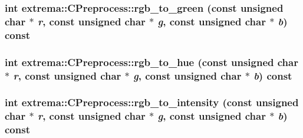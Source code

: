 \hypertarget{classextrema_1_1CPreprocess_2e6c88fd73ae9e2728e153124d6b55f0}{
\subsubsection[rgb\_\-to\_\-green]{\setlength{\rightskip}{0pt plus 5cm}int extrema::CPreprocess::rgb\_\-to\_\-green (const unsigned char $\ast$ {\em r}, const unsigned char $\ast$ {\em g}, const unsigned char $\ast$ {\em b}) const}}
\label{classextrema_1_1CPreprocess_2e6c88fd73ae9e2728e153124d6b55f0}


\hypertarget{classextrema_1_1CPreprocess_ba615f38b0c242f788113329ec4823ea}{
\subsubsection[rgb\_\-to\_\-hue]{\setlength{\rightskip}{0pt plus 5cm}int extrema::CPreprocess::rgb\_\-to\_\-hue (const unsigned char $\ast$ {\em r}, const unsigned char $\ast$ {\em g}, const unsigned char $\ast$ {\em b}) const}}
\label{classextrema_1_1CPreprocess_ba615f38b0c242f788113329ec4823ea}


\hypertarget{classextrema_1_1CPreprocess_c02257ed4a69dd5abd3fc5d6ed369c37}{
\subsubsection[rgb\_\-to\_\-intensity]{\setlength{\rightskip}{0pt plus 5cm}int extrema::CPreprocess::rgb\_\-to\_\-intensity (const unsigned char $\ast$ {\em r}, const unsigned char $\ast$ {\em g}, const unsigned char $\ast$ {\em b}) const}}
\label{classextrema_1_1CPreprocess_c02257ed4a69dd5abd3fc5d6ed369c37}


